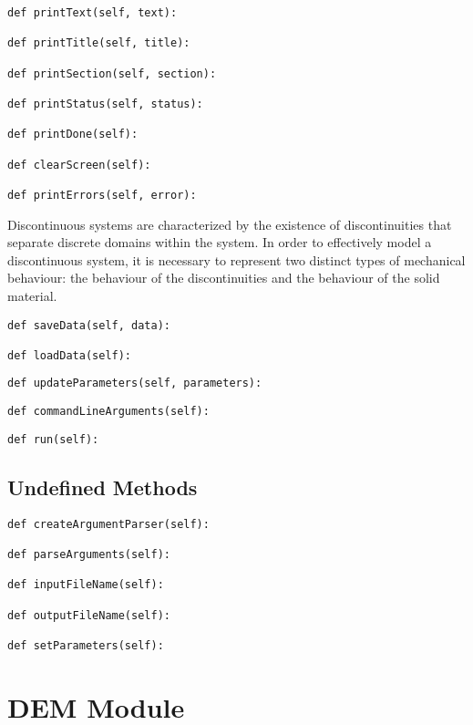 \begin{lstlisting}[frame=single]
def printText(self, text):

def printTitle(self, title):

def printSection(self, section):

def printStatus(self, status):

def printDone(self):

def clearScreen(self):

def printErrors(self, error):
\end{lstlisting}

Discontinuous systems are characterized by the existence of discontinuities that separate discrete domains within the system. In order to effectively model a discontinuous system, it is necessary to represent two distinct types of mechanical behaviour: the behaviour of the discontinuities and the behaviour of the solid material.

\begin{lstlisting}[frame=single]        
def saveData(self, data):

def loadData(self):
\end{lstlisting}


\begin{lstlisting}[frame=single]    
def updateParameters(self, parameters):
\end{lstlisting}


\begin{lstlisting}[frame=single]
def commandLineArguments(self):
\end{lstlisting}


\begin{lstlisting}[frame=single]    
def run(self):
\end{lstlisting}

\subsection{Undefined Methods}

\begin{lstlisting}[frame=single]    
def createArgumentParser(self):
    
def parseArguments(self):

def inputFileName(self):
        
def outputFileName(self):
    
def setParameters(self):
\end{lstlisting}


\section{DEM Module}

